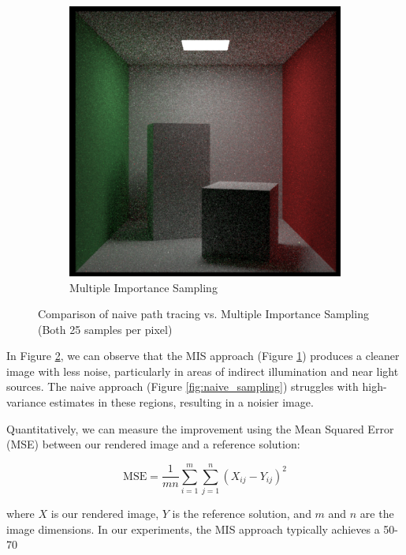 \documentclass[12pt]{article}
\begin{document}
\begin{figure}[H]
\begin{subfigure}[b]{0.45\textwidth}
        \includegraphics[width=\textwidth]{images/25_samp/combPDF.png}
        \caption{Multiple Importance Sampling}
        \label{fig:mis_sampling}
    \end{subfigure}
    \caption{Comparison of naive path tracing vs. Multiple Importance Sampling (Both 25 samples per pixel)}
    \label{fig:sampling_comparison}
\end{figure}

In Figure \ref{fig:sampling_comparison}, we can observe that the MIS approach (Figure \ref{fig:mis_sampling}) produces a cleaner image with less noise, particularly in areas of indirect illumination and near light sources. The naive approach (Figure \ref{fig:naive_sampling}) struggles with high-variance estimates in these regions, resulting in a noisier image.

Quantitatively, we can measure the improvement using the Mean Squared Error (MSE) between our rendered image and a reference solution:

\[
    \text{MSE} = \frac{1}{mn} \sum_{i=1}^m \sum_{j=1}^n (X_{ij} - Y_{ij})^2
\]

where \( X \) is our rendered image, \( Y \) is the reference solution, and \( m \) and \( n \) are the image dimensions. In our experiments, the MIS approach typically achieves a 50-70%
\end{document}

